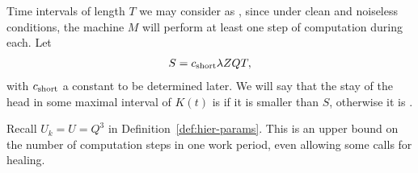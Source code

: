 \documentclass[11pt]{memoir}
\theoremstyle{definition} %
\renewcommand{\le}{\leq}
\renewcommand{\ge}{\geq}
\def\B{B}
\def\U{U}
\newcommand{\Q}{Q} %
\renewcommand{\S}{S} %
\newcommand{\Tu}{T}
\newcommand{\Z}{Z} %
\newcommand{\cns}[1]{c_{\textrm{\upshape #1}}}
\newcommand{\CShort}{\cns{short}}
\begin{document}



Time intervals of length \( \Tu \) we may consider as , since under clean and
noiseless conditions,
the machine \( M \) will perform at least one step of computation during each.
Let
  \begin{align}\label{eq:S-def}
   \S =\CShort\lambda\Z\Q\Tu,
  \end{align}
  with \( \CShort \) a constant to be determined later.
  We will say that the stay of the head in some maximal interval of \( K(t) \) is 
  if it is smaller than \( \S \), otherwise it is .
  

Recall  \( \U_{k} = \U =\Q^{3} \) in Definition~\ref{def:hier-params}.
This is an upper bound on the number of computation steps in one work period, even
allowing some calls for healing.
\end{document}
